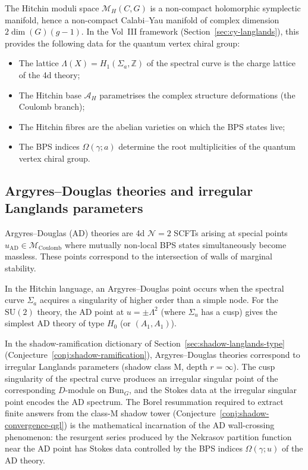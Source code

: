 The Hitchin moduli space $\mathcal{M}_H(C, G)$ is a non-compact holomorphic
symplectic manifold, hence a non-compact Calabi--Yau manifold of complex
dimension $2\dim(G)(g-1)$. In the Vol~III framework (Section~\ref{sec:cy-langlands}),
this provides the following data for the quantum vertex chiral group:
\begin{itemize}
\item The lattice $\Lambda(X) = H_1(\Sigma_a, \mathbb{Z})$ of the spectral
 curve is the charge lattice of the 4d theory;
\item The Hitchin base $\mathcal{A}_H$ parametrises the complex structure
 deformations (the Coulomb branch);
\item The Hitchin fibres are the abelian varieties on which the BPS states live;
\item The BPS indices $\Omega(\gamma; a)$ determine the root multiplicities of
 the quantum vertex chiral group.
\end{itemize}

\subsection{Argyres--Douglas theories and irregular Langlands parameters}
\label{subsec:phys-argyres-douglas}

Argyres--Douglas (AD) theories are 4d $\mathcal{N}=2$ SCFTs arising at special
points $u_{\mathrm{AD}} \in \mathcal{M}_{\mathrm{Coulomb}}$ where mutually
non-local BPS states simultaneously become massless. These points correspond to
the intersection of walls of marginal stability.

In the Hitchin language, an Argyres--Douglas point occurs when the spectral
curve $\Sigma_a$ acquires a singularity of higher order than a simple node.
For the $\mathrm{SU}(2)$ theory, the AD point at $u = \pm \Lambda^2$ (where
$\Sigma_u$ has a cusp) gives the simplest AD theory of type $H_0$ (or $(A_1, A_1)$).

\begin{remark}
\label{rem:phys-ad-irregular}
In the shadow-ramification dictionary of Section~\ref{sec:shadow-langlands-type}
(Conjecture~\ref{conj:shadow-ramification}), Argyres--Douglas theories
correspond to irregular Langlands parameters (shadow class M, depth $r = \infty$).
The cusp singularity of the spectral curve produces an irregular singular point
of the corresponding $D$-module on $\mathrm{Bun}_G$, and the Stokes data at
the irregular singular point encodes the AD spectrum. The Borel resummation
required to extract finite answers from the class-M shadow tower (Conjecture~\ref{conj:shadow-convergence-qgl}) is the mathematical incarnation of the
AD wall-crossing phenomenon: the resurgent series produced by the Nekrasov
partition function near the AD point has Stokes data controlled by the BPS
indices $\Omega(\gamma; u)$ of the AD theory.
\end{remark}

